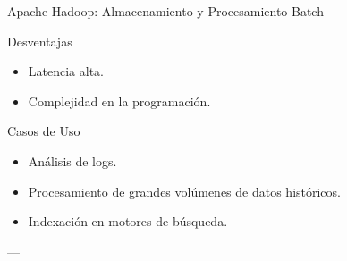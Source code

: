 \documentclass[presentation]{beamer}
\begin{document}
\begin{frame}[label={sec:org5e8c861}]{Apache Hadoop: Almacenamiento y Procesamiento Batch}
\begin{block}{Desventajas}
\begin{itemize}
\item Latencia alta.
\item Complejidad en la programación.
\end{itemize}
\end{block}

\begin{block}{Casos de Uso}
\begin{itemize}
\item Análisis de logs.
\item Procesamiento de grandes volúmenes de datos históricos.
\item Indexación en motores de búsqueda.
\end{itemize}

---
\end{block}
\end{frame}
\end{document}
